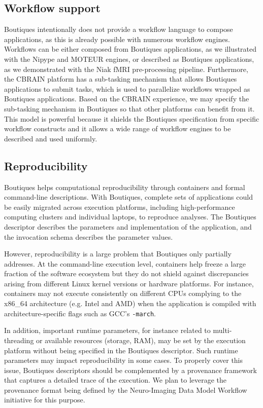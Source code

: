 \documentclass[a4paper,num-refs]{oup-contemporary}
\newcommand{\boutiques}{Boutiques\xspace}
\begin{document}
\subsection{Workflow support}

\boutiques intentionally does not provide a workflow language to
compose applications, as this is already possible with numerous
workflow engines. Workflows can be either composed from \boutiques
applications, as we illustrated with the Nipype and MOTEUR engines, or
described as \boutiques applications, as we demonstrated with the Niak
fMRI pre-processing pipeline. Furthermore, the CBRAIN platform has a
sub-tasking mechanism that allows \boutiques applications to submit
tasks, which is used to parallelize workflows wrapped as \boutiques
applications. Based on the CBRAIN experience, we may specify the
sub-tasking mechanism in \boutiques so that other platforms can
benefit from it.  This model is powerful because it shields the
\boutiques specification from specific workflow constructs and it allows
a wide range of workflow engines to be described and used uniformly.


\subsection{Reproducibility}

\boutiques helps computational reproducibility through containers and formal
command-line descriptions. With \boutiques, complete sets of
applications could be easily migrated across execution platforms,
including high-performance computing clusters and individual laptops,
to reproduce analyses. The \boutiques descriptor describes the
parameters and implementation of the application, and the invocation
schema describes the parameter values.

However, reproducibility is a large problem that \boutiques only
partially addresses. At the command-line execution level, containers
help freeze a large fraction of the software ecosystem but they do not
shield against discrepancies arising from different Linux kernel
versions or hardware platforms. For instance, containers may not
execute consistently on different CPUs complying to the x86\_64
architecture (e.g. Intel and AMD) when the application is compiled with
architecture-specific flags such as GCC's \texttt{-march}.

In addition, important runtime parameters, for instance related to
multi-threading or available resources (storage, RAM), may be set by
the execution platform without being specified in the \boutiques
descriptor. Such runtime parameters may impact reproducibility in some
cases. To properly cover this issue, \boutiques descriptors should be
complemented by a provenance framework that captures a detailed trace
of the execution. We plan to leverage the provenance format being
defined by the Neuro-Imaging Data Model
Workflow~\cite{ghosh2017capturing} initiative for this purpose.
\end{document}
